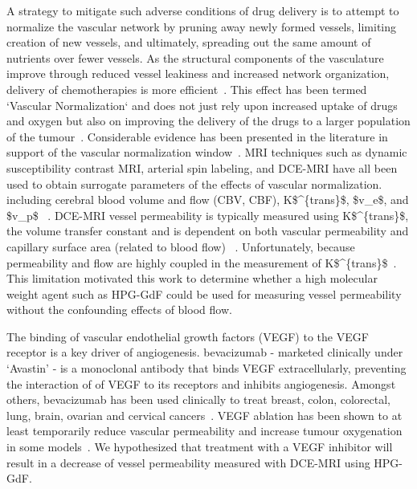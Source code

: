 A strategy to mitigate such adverse conditions of drug delivery is to attempt to normalize the vascular network by pruning away newly formed vessels, limiting creation of new vessels, and ultimately, spreading out the same amount of nutrients over fewer vessels.
As the structural components of the vasculature improve through reduced vessel leakiness and increased network organization, delivery of chemotherapies is more efficient~\cite{Jain:2001uf}.
This effect has been termed `Vascular Normalization` and does not just rely upon increased uptake of drugs and oxygen but also on improving the delivery of the drugs to a larger population of the tumour~\cite{Jain:2005gk}.
Considerable evidence has been presented in the literature in support of the vascular normalization window~\cite{Jain:2005gk,Viallard:2017ck,Martin:2019io}.
MRI techniques such as dynamic susceptibility contrast MRI, arterial spin labeling, and \acs{DCE-MRI} have all been used to obtain surrogate parameters of the effects of vascular normalization.
including cerebral blood volume and flow (CBV, CBF), \acs{K$^{trans}$}, \acs{$v_e$}, and \acs{$v_p$} ~.
\acs{DCE-MRI} vessel permeability is typically measured using \acs{K$^{trans}$}, the volume transfer constant and is dependent on both vascular permeability and capillary surface area (related to blood flow) ~\cite{Tofts:1999we}. 
Unfortunately, because permeability and flow are highly coupled in the measurement of \acs{K$^{trans}$}~\cite{Tofts:1999we}.
This limitation motivated this work to determine whether a high molecular weight agent such as \acs{HPG-GdF} could be used for measuring vessel permeability without the confounding effects of blood flow.

The binding of vascular endothelial growth factors (\acs{VEGF}) to the \acs{VEGF} receptor is a key driver of angiogenesis.
bevacizumab - marketed clinically under `Avastin' - is a monoclonal antibody that binds VEGF extracellularly, preventing the interaction of of \acs{VEGF} to its receptors and inhibits angiogenesis. 
Amongst others, bevacizumab has been used clinically to treat breast, colon, colorectal, lung, brain, ovarian and cervical cancers~\cite{Genentech:2019th}. 
\acs{VEGF} ablation has been shown to at least temporarily reduce vascular permeability and increase tumour oxygenation in some models~\cite{OConnor:2012ie}.
We hypothesized that treatment with a \acs{VEGF} inhibitor will result in a decrease of vessel permeability measured with \acs{DCE-MRI} using HPG-GdF.

